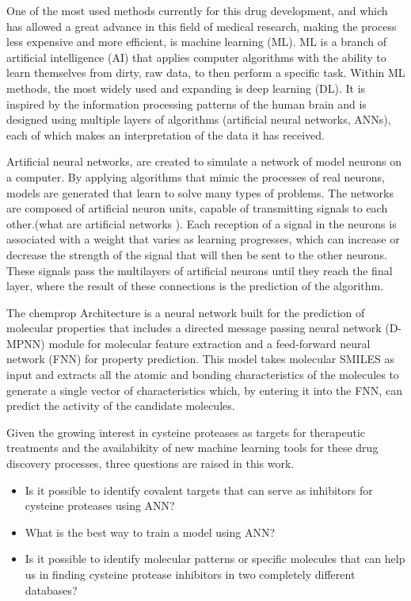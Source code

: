 \documentclass[final,times,twocolumn,article]{elsarticle}
\begin{document}
One of the most used methods currently for this drug development, and which has allowed a great advance in this field of medical research, making the process less expensive and more efficient, is machine learning (ML). ML is a branch of artificial intelligence (AI) that applies computer algorithms with the ability to learn themselves from dirty, raw data, to then perform a specific task. Within ML methods, the most widely used and expanding is deep learning (DL). It is inspired by the information processing patterns of the human brain and is designed using multiple layers of algorithms (artificial neural networks, ANNs), each of which makes an interpretation of the data it has received. \cite{Alzubaidi2021} 

Artificial neural networks, are created to simulate a network of model neurons on a computer. By applying algorithms that mimic the processes of real neurons, models are generated that learn to solve many types of problems. The networks are composed of artificial neuron units, capable of transmitting signals to each other.(what are artificial networks ). Each reception of a signal in the neurons is associated with a weight that varies as learning progresses, which can increase or decrease the strength of the signal that will then be sent to the other neurons. These signals pass the multilayers of artificial neurons until they reach the final layer, where the result of these connections is the prediction of the algorithm. \cite{Talevi2020}

The chemprop Architecture is a neural network built for the prediction of molecular properties that includes a directed message passing neural network (D-MPNN) module for molecular feature extraction and a feed-forward neural network (FNN) for property prediction. This model takes molecular SMILES as input and extracts all the atomic and bonding characteristics of the molecules to generate a single vector of characteristics which, by entering it into the FNN, can predict the activity of the candidate molecules. \cite{Wang2022}

Given the growing interest in cysteine proteases as targets for therapeutic treatments and the availabikity of new machine learning tools for these drug discovery processes, three questions are raised in this work.

\begin{itemize}
    \item Is it possible to identify covalent targets that can serve as inhibitors for cysteine proteases using ANN?
    \item What is the best way to train a model using ANN?
    \item Is it possible to identify molecular patterns or specific molecules that can help us in finding cysteine protease inhibitors in two completely different databases?
    
\end{itemize}
\end{document}
